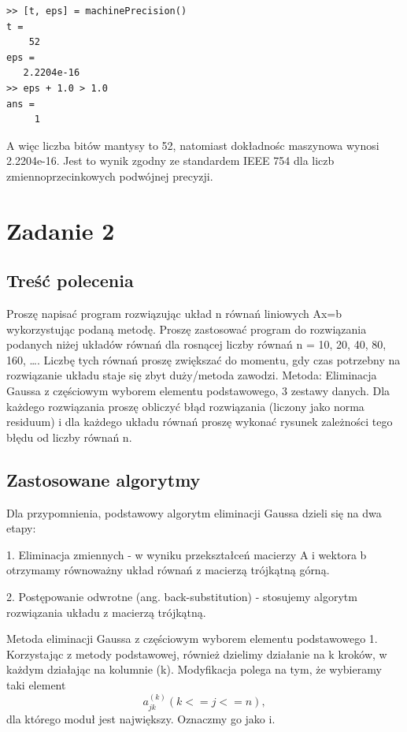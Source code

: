 \documentclass[11pt]{article} %
\begin{document}
\begin{verbatim}
>> [t, eps] = machinePrecision()
t =
    52
eps =
   2.2204e-16
>> eps + 1.0 > 1.0
ans =
     1
\end{verbatim}
A więc liczba bitów mantysy to 52, natomiast dokładnośc maszynowa wynosi 2.2204e-16. Jest to wynik zgodny ze standardem IEEE 754 dla liczb zmiennoprzecinkowych podwójnej precyzji.

\section{Zadanie 2}

\subsection{Treść polecenia}

Proszę napisać program rozwiązując układ n równań liniowych Ax=b wykorzystując podaną metodę. Proszę zastosować program do rozwiązania podanych niżej układów równań dla rosnącej liczby równań n = 10, 20, 40, 80, 160, …. Liczbę tych równań proszę zwiększać do momentu, gdy czas potrzebny na rozwiązanie układu staje się zbyt duży/metoda zawodzi.
Metoda: Eliminacja Gaussa z częściowym wyborem elementu podstawowego, 3 zestawy danych.
Dla każdego rozwiązania proszę obliczyć błąd rozwiązania (liczony jako norma residuum) i dla każdego układu równań proszę wykonać rysunek zależności tego błędu od liczby równań n.

\subsection{Zastosowane algorytmy}
Dla przypomnienia, podstawowy algorytm eliminacji Gaussa dzieli się na dwa etapy:

1. Eliminacja zmiennych - w wyniku przekształceń macierzy A i wektora b otrzymamy równoważny układ równań z macierzą trójkątną górną.

2. Postępowanie odwrotne (ang. back-substitution) - stosujemy algorytm rozwiązania układu z macierzą trójkątną.

Metoda eliminacji Gaussa z częściowym wyborem elementu podstawowego
1. Korzystając z metody podstawowej, również dzielimy działanie na k kroków, w każdym działając na kolumnie (k). Modyfikacja polega na tym, że wybieramy taki element 
\begin{equation}
a_{jk}^{(k)} (k <= j <=n),
\end{equation} 
dla którego moduł jest największy. Oznaczmy go jako i.
\end{document}
